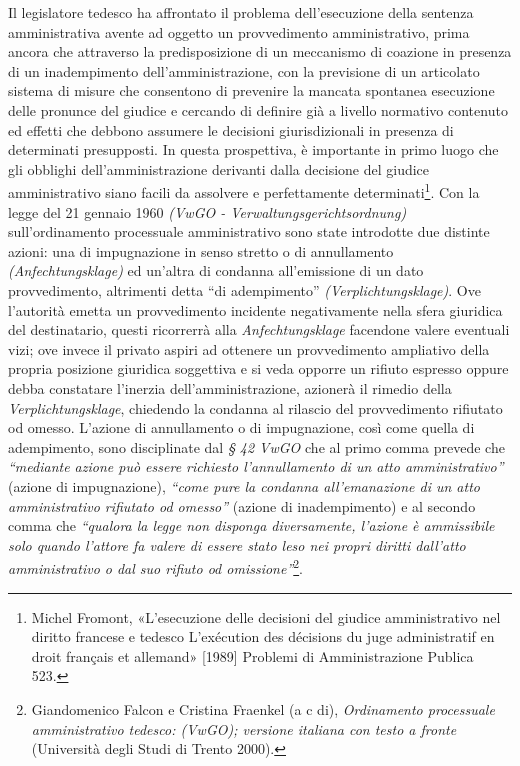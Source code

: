 \documentclass[12pt,it,a4paper,]{report}
\begin{document}
Il legislatore tedesco ha affrontato il problema dell'esecuzione della
sentenza amministrativa avente ad oggetto un provvedimento
amministrativo, prima ancora che attraverso la predisposizione di un
meccanismo di coazione in presenza di un inadempimento
dell'amministrazione, con la previsione di un articolato sistema di
misure che consentono di prevenire la mancata spontanea esecuzione delle
pronunce del giudice e cercando di definire già a livello normativo
contenuto ed effetti che debbono assumere le decisioni giurisdizionali
in presenza di determinati presupposti. In questa prospettiva, è
importante in primo luogo che gli obblighi dell'amministrazione
derivanti dalla decisione del giudice amministrativo siano facili da
assolvere e perfettamente determinati\footnote{{Michel Fromont,
  {«L'esecuzione delle decisioni del giudice amministrativo nel diritto
  francese e tedesco L'exécution des décisions du juge administratif en
  droit français et allemand»} {[}1989{]} Problemi di Amministrazione
  Publica 523.}}. Con la legge del 21 gennaio 1960 \emph{(VwGO -
Verwaltungsgerichtsordnung)} sull'ordinamento processuale amministrativo
sono state introdotte due distinte azioni: una di impugnazione in senso
stretto o di annullamento \emph{(Anfechtungsklage)} ed un'altra di
condanna all'emissione di un dato provvedimento, altrimenti detta ``di
adempimento'' \emph{(Verplichtungsklage)}. Ove l'autorità emetta un
provvedimento incidente negativamente nella sfera giuridica del
destinatario, questi ricorrerrà alla \emph{Anfechtungsklage} facendone
valere eventuali vizi; ove invece il privato aspiri ad ottenere un
provvedimento ampliativo della propria posizione giuridica soggettiva e
si veda opporre un rifiuto espresso oppure debba constatare l'inerzia
dell'amministrazione, azionerà il rimedio della
\emph{Verplichtungsklage}, chiedendo la condanna al rilascio del
provvedimento rifiutato od omesso. L'azione di annullamento o di
impugnazione, così come quella di adempimento, sono disciplinate dal
\emph{§ 42 VwGO} che al primo comma prevede che \emph{``mediante azione
può essere richiesto l'annullamento di un atto amministrativo''} (azione
di impugnazione), \emph{``come pure la condanna all'emanazione di un
atto amministrativo rifiutato od omesso''} (azione di inadempimento) e
al secondo comma che \emph{``qualora la legge non disponga diversamente,
l'azione è ammissibile solo quando l'attore fa valere di essere stato
leso nei propri diritti dall'atto amministrativo o dal suo rifiuto od
omissione''}\footnote{{Giandomenico Falcon e Cristina Fraenkel (a c di),
  \emph{Ordinamento processuale amministrativo tedesco: (VwGO); versione
  italiana con testo a fronte} (Università degli Studi di Trento 2000).}}.
\end{document}
